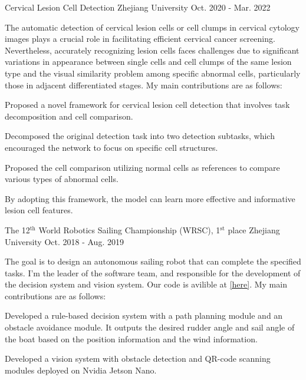 \begin{cventries}
	\cventry
	{} %
	{Cervical Lesion Cell Detection} %
	{Zhejiang University} %
	{Oct. 2020 - Mar. 2022} %
	{
		\quad The automatic detection of cervical lesion cells or cell clumps in cervical cytology images plays a crucial role in facilitating efficient cervical cancer screening. Nevertheless, accurately recognizing lesion cells faces challenges due to significant variations in appearance between single cells and cell clumps of the same lesion type and the visual similarity problem among specific abnormal cells, particularly those in adjacent differentiated stages. \newline
		My main contributions are as follows: \newline
		\vspace{4mm}
		\begin{cvitems} %
			\item{Proposed a novel framework for cervical lesion cell detection that involves task decomposition and cell comparison.}
			\item{Decomposed the original detection task into two detection subtasks, which encouraged the network to focus on specific cell structures.}
			\item{Proposed the cell comparison utilizing normal cells as references to compare various types of abnormal cells.}
			\item{By adopting this framework, the model can learn more effective and informative lesion cell features.}
		\end{cvitems}
		\vspace{2mm}
	}

	\cventry
	{} %
	{The 12$^\text{th}$ World Robotics Sailing Championship (WRSC), 1$^\text{st}$ place} %
	{Zhejiang University} %
	{Oct. 2018 - Aug. 2019} %
	{
		\quad The goal is to design an autonomous sailing robot that can complete the specified tasks. I'm the leader of the software team, and responsible for the development of the decision system and vision system. Our code is avilible at \href{https://github.com/ZMART-Sailing/sailing_robot}{\textcolor{link}{[here]}}.\newline
		My main contributions are as follows: \newline
		\vspace{4mm}
		\begin{cvitems} %
			\item{Developed a rule-based decision system with a path planning module and an obstacle avoidance module. It outputs the desired rudder angle and sail angle of the boat based on the position information and the wind information.}
			\item{Developed a vision system with obstacle detection and QR-code scanning modules deployed on Nvidia Jetson Nano.}
		\end{cvitems}
		\vspace{2mm}
	}


\end{cventries}

